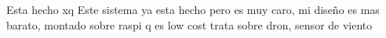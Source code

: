 
Esta hecho xq
Este sistema ya esta hecho pero es muy caro, mi diseño es mas barato, montado sobre raspi q es low cost
trata sobre dron, sensor de viento 
